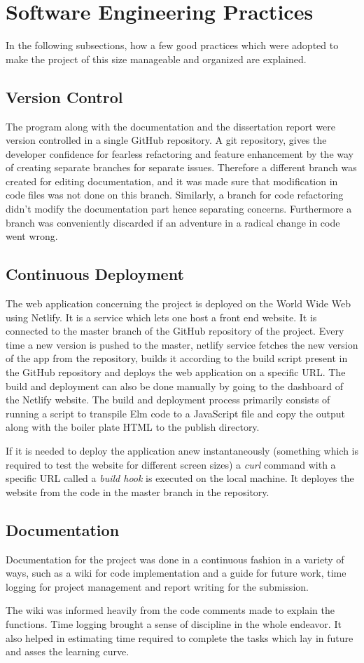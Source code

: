 \section{Software Engineering Practices}
In the following subsections, how a few good practices which were adopted to
make the project of this size manageable and organized are explained.

\subsection{Version Control}
The program along with the documentation and the dissertation report were
version controlled in a single GitHub repository. A git repository, gives the
developer confidence for fearless refactoring and feature enhancement by the
way of creating separate branches for separate issues. Therefore a different
branch was created for editing documentation, and it was made sure that
modification in code files was not done on this branch. Similarly, a branch for
code refactoring didn't modify the documentation part hence separating
concerns.  Furthermore a branch was conveniently discarded if an adventure in a
radical change in code went wrong.

\subsection{Continuous Deployment}
The web application concerning the project is deployed on the World Wide Web
using Netlify. It is a service which lets one host a front end website. It is
connected to the master branch of the GitHub repository of the project. Every
time a new version is pushed to the master, netlify service fetches the new
version of the app from the repository, builds it according to the build script
present in the GitHub repository and deploys the web application on a specific
URL. The build and deployment can also be done manually by going to the
dashboard of the Netlify website. The build and deployment process primarily
consists of running a script to transpile Elm code to a JavaScript file and copy
the output along with the boiler plate HTML to the publish directory.

If it is needed to deploy the application anew instantaneously (something which
is required to test the website for different screen sizes) a \emph{curl}
command with a specific URL called a \emph{build hook} is executed on the local
machine.  It deployes the website from the code in the master branch in the
repository.


\subsection{Documentation}
Documentation for the project was done in a continuous fashion in a variety of
ways, such as a wiki for code implementation and a guide for future work, time
logging for project management and report writing for the submission. 

The wiki was informed heavily from the code comments made to explain the
functions. Time logging brought a sense of discipline in the whole endeavor.
It also helped in estimating time required to complete the tasks which lay in
future and asses the learning curve.
